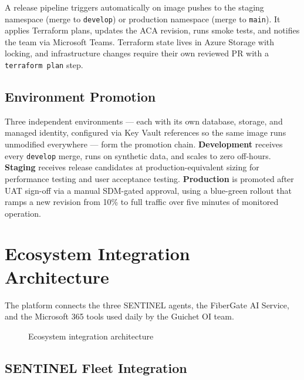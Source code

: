 A release pipeline triggers automatically on image pushes to the staging namespace (merge to \texttt{develop}) or production namespace (merge to \texttt{main}). It applies Terraform plans, updates the ACA revision, runs smoke tests, and notifies the team via Microsoft Teams. Terraform state lives in Azure Storage with locking, and infrastructure changes require their own reviewed PR with a \texttt{terraform plan} step.

\subsection{Environment Promotion}

Three independent environments — each with its own database, storage, and managed identity, configured via Key Vault references so the same image runs unmodified everywhere — form the promotion chain. \textbf{Development} receives every \texttt{develop} merge, runs on synthetic data, and scales to zero off-hours. \textbf{Staging} receives release candidates at production-equivalent sizing for performance testing and user acceptance testing. \textbf{Production} is promoted after UAT sign-off via a manual SDM-gated approval, using a blue-green rollout that ramps a new revision from 10\% to full traffic over five minutes of monitored operation.

\bigskip

\section{Ecosystem Integration Architecture}

The platform connects the three SENTINEL agents, the FiberGate AI Service, and the Microsoft 365 tools used daily by the Guichet OI team.

\begin{figure}[H]
  \centering
  \caption{Ecosystem integration architecture}
  \label{fig:ecosystem-integration}
\end{figure}

\subsection{SENTINEL Fleet Integration}

